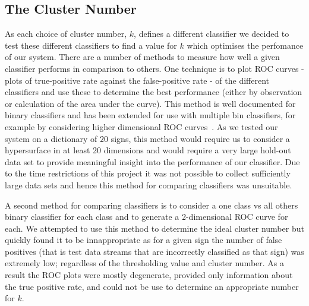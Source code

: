 \subsection{The Cluster Number}
As each choice of cluster number, $k$, defines a different classifier we decided to test these different classifiers to find a value for $k$ which optimises the perfomance of our system. There are a number of methods to measure how well a given classifier performs in comparison to others. One technique is to plot ROC curves - plots of true-positive rate against the false-positive rate - of the different classifiers and use these to determine the best performance (either by observation or calculation of the area under the curve). This method is well documented for binary classifiers and has been extended for use with multiple bin classifiers, for example by considering higher dimensional ROC curves~\citep{landgrebe2006simplified}. As we tested our system on a dictionary of $20$ signs, this method would require us to consider a hypersurface in at least 20 dimensions and would require a very large hold-out data set to provide meaningful insight into the performance of our classifier. Due to the time restrictions of this project it was not possible to collect sufficiently large data sets and hence this method for comparing classifiers was unsuitable. 

A second method for comparing classifiers is to consider a one class vs all others binary classifier for each class and to generate a 2-dimensional ROC curve for each. We attempted to use this method to determine the ideal cluster number but quickly found it to be innappropriate as for a given sign the number of false positives (that is test data streams that are incorrectly classified as that sign) was extremely low; regardless of the thresholding value and cluster number. As a result the ROC plots were mostly degenerate, provided only information about the true positive rate, and could not be use to determine an appropriate number for $k$.

